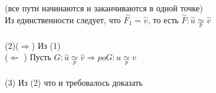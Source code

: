 	(все пути начинаются и заканчиваются в одной точке)\\
	Из единственности следует, что $\overset{\sim}{F_1} = \overset{\sim}{v}$, то есть $\overset{\sim}{F}: \overset{\sim}{u} \underset{p}{\simeq}\overset{\sim}{v}$\\
	\\
	(2)($\Rightarrow$) Из (1)\\
	($\Leftarrow$ ) Пусть $G: \overset{\sim}{u} \underset{p}{\simeq}\overset{\sim}{v} \Rightarrow poG: u \underset{p}{\simeq} v$\\
	\\
	(3) Из (2) что и требовалось доказать\\



\newpage
